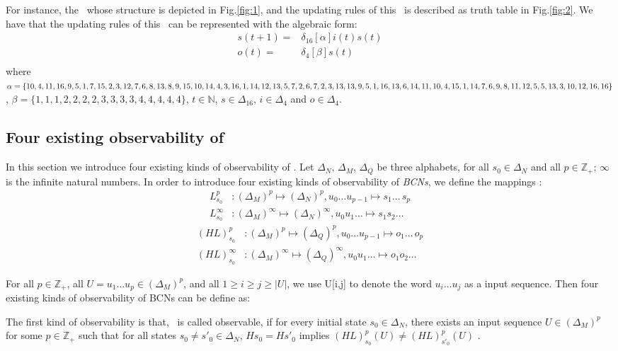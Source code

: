 For instance, the \BCN\ whose structure is depicted in Fig.\ref{fig:1}, and the updating rules of this \BCN\ is described as truth table in Fig.\ref{fig:2}. We have that the updating rules of this \BCN\ can be represented with the algebraic form:
\begin{equation}
\begin{split}
s(t+1) =&\delta_{16}[\alpha]i(t)s(t)\\
o(t) =&\delta_4[\beta]s(t)\\
\end{split}
\end{equation}
where $\alpha=\{10,4,11,16,9,5,1, 7,15,2,3,12,7,6,8,13,8,9,\\15,10,14,4,3,16,1,14,12,13,5,7,2,6,7,2,3,13,13,9,5,1,\\16,13 ,6,14,11,10,4,15,1,14 ,7,6,9 ,8,11,12,5,5,13,3,10,\\12,16,16\}$, $\beta=\{1,1,1,2,2,2,2,3,3,3,3,4,4,4,4,4\}$, $t\in \mathbb{N}$, $s\in \Delta_{16}$, $i\in \Delta_4$ and $o\in \Delta_4$.
\subsection{Four existing observability of \BCNs}
In this section we introduce four existing kinds of observability of \BCNs. Let $\Delta_N$, $\Delta_M$, $\Delta_Q$ be three alphabets, for all $s_0\in \Delta_N$ and all $p\in \mathbb{Z}_+$; $\infty$ is the infinite natural numbers. In order to introduce four existing kinds of observability of {\em BCNs}, we define the mappings \cite{Zhang2016Observability}:
\begin{equation}
\begin{split}
L^p_{s_0} &: (\Delta_M)^p\mapsto(\Delta_N)^p, u_0\ldots u_{p-1} \mapsto s_1 \ldots\, s_p\\
L^{\infty}_{s_0} &: (\Delta_M)^{\infty}\mapsto(\Delta_N)^{\infty}, u_0 u_1 \ldots  \mapsto s_1 s_2 \ldots
\end{split}
\end{equation}
\begin{equation}
\begin{split}
(HL)^p_{s_0} &: (\Delta_M)^p\mapsto(\Delta_Q)^p, u_0\ldots u_{p-1} \mapsto o_1\ldots\, o_p\\
(HL)^{\infty}_{s_0} &: (\Delta_M)^{\infty}\mapsto(\Delta_Q)^{\infty}, u_0 u_1 \ldots  \mapsto o_1 o_2\ldots
\end{split}
\end{equation}

For all  $p\in \mathbb{Z}_+$, all $U=u_1 \ldots u_p \in(\Delta_M)^p$, and all $1\ge i \ge j \ge |U|$, we use U[i,j] to denote the word $u_i \ldots u_j$ as a input sequence. Then four existing kinds of observability of BCNs can be define as: 
\begin{definition}
The first kind of observability is that, \BCN\ is called observable, if for every initial state $s_0 \in \Delta_N$, there exists an input sequence $U\in(\Delta_M)^p$ for some $p\in \mathbb{Z}_+$ such that for all states $s_0\neq {s'}_0\in \Delta_N$, $Hs_0=H{s'}_0$ implies $(HL)^p_{s_0}(U)\neq (HL)^p_{{s'}_0}(U)$ \cite{cheng2009controllability}.
\end{definition}


